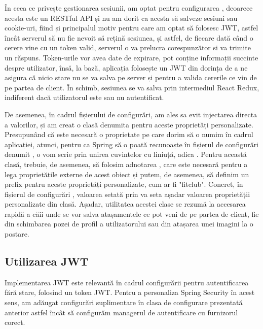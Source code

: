 În ceea ce privește gestionarea sesiunii, am optat pentru configurarea , deoarece acesta este un RESTful API și nu am dorit ca acesta să salveze sesiuni sau cookie-uri, fiind și principalul motiv pentru care am optat să folosesc JWT, astfel încât serverul să nu fie nevoit să rețină sesiunea, și astfel, de fiecare dată când o cerere vine cu un token valid, serverul o va prelucra corespunzător si va trimite un răspuns. Token-urile vor avea date de expirare, pot conține informații succinte despre utilizator, însă, la bază, aplicația folosește un JWT din dorința de a ne asigura că nicio stare nu se va salva pe server și pentru a valida cererile ce vin de pe partea de client. În schimb, sesiunea se va salva prin intermediul React Redux, indiferent dacă utilizatorul este sau nu autentificat.\newline

De asemenea, în cadrul fișierului de configurări, am ales sa evit injectarea directa a valorilor, și am creat o clasă denumita  pentru aceste proprietăți personalizate. Presupunând că este necesară o proprietate pe care dorim să o numim  în cadrul aplicației, atunci, pentru ca Spring să o poată recunoaște în fișierul de configurări denumit , o vom scrie prin unirea cuvintelor cu liniuță, adica .
Pentru această clasă, trebuie, de asemenea, să folosim adnotarea , care este necesară pentru a lega proprietățile externe de acest obiect și putem, de asemenea, să definim un prefix pentru aceste proprietăți personalizate, cum ar fi "fitclub". Concret, în fișierul de configurări , valoarea setată prin  va seta așadar valoarea proprietății personalizate din clasă.\newline 
Așadar, utilitatea acestei clase se rezumă la accesarea rapidă a căii unde se vor salva atașamentele ce pot veni de pe partea de client, fie din schimbarea pozei de profil a utilizatorului sau din atașarea unei imagini la o postare.\newline

\subsection{Utilizarea JWT}

Implementarea JWT este relevantă în cadrul configurării pentru autentificarea fără stare, folosind un token JWT. Pentru a personaliza Spring Security în acest sens, am adăugat configurări suplimentare în clasa de configurare prezentată anterior astfel încât să configurăm managerul de autentificare cu furnizorul corect.\newline

